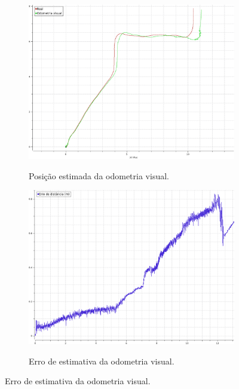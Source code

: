 \documentclass[repeatfields,xlists,xpacks,oneside,yearsonly]{ufrgscca}
\begin{document}
\begin{figure}[h]
    \caption{Resultado da odometria visual.}
    \label{fig:visual_odom_result}
    \begin{subfigure}{0.5\linewidth}
        {
            \centering
            \caption{Posição estimada da odometria visual.}
            \label{fig:odom_visual}
            \includegraphics[width=0.98\linewidth]{odom-visual.png}\\
        }
    \end{subfigure}
    \begin{subfigure}{0.5\linewidth}
        {
            \centering
            \caption{Erro de estimativa da odometria visual.}
            \label{fig:odom_visual_error}
            \includegraphics[width=0.98\linewidth]{odom-visual-error.png}\\
        }
    \end{subfigure}
\end{figure}
\end{document}
